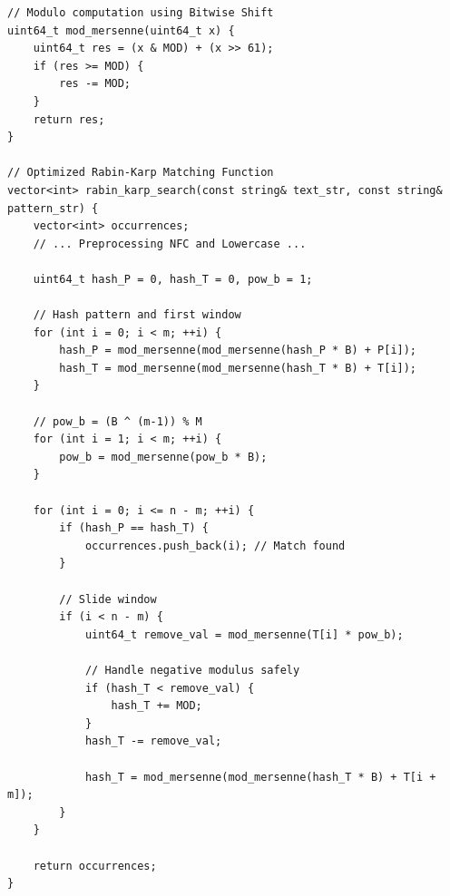 \documentclass[a4paper,12pt]{article}
\begin{document}
\begin{verbatim}
// Modulo computation using Bitwise Shift
uint64_t mod_mersenne(uint64_t x) {
    uint64_t res = (x & MOD) + (x >> 61);
    if (res >= MOD) {
        res -= MOD;
    }
    return res;
}

// Optimized Rabin-Karp Matching Function
vector<int> rabin_karp_search(const string& text_str, const string& pattern_str) {
    vector<int> occurrences;
    // ... Preprocessing NFC and Lowercase ...
    
    uint64_t hash_P = 0, hash_T = 0, pow_b = 1;
    
    // Hash pattern and first window
    for (int i = 0; i < m; ++i) {
        hash_P = mod_mersenne(mod_mersenne(hash_P * B) + P[i]);
        hash_T = mod_mersenne(mod_mersenne(hash_T * B) + T[i]);
    }
    
    // pow_b = (B ^ (m-1)) % M
    for (int i = 1; i < m; ++i) {
        pow_b = mod_mersenne(pow_b * B);
    }
    
    for (int i = 0; i <= n - m; ++i) {
        if (hash_P == hash_T) {
            occurrences.push_back(i); // Match found
        }
        
        // Slide window
        if (i < n - m) {
            uint64_t remove_val = mod_mersenne(T[i] * pow_b);
            
            // Handle negative modulus safely
            if (hash_T < remove_val) {
                hash_T += MOD;
            }
            hash_T -= remove_val;
            
            hash_T = mod_mersenne(mod_mersenne(hash_T * B) + T[i + m]);
        }
    }
    
    return occurrences;
}
\end{verbatim}
\end{document}
